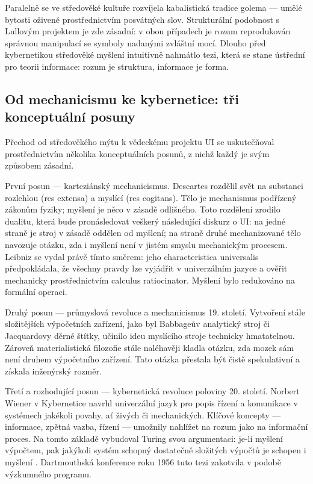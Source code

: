 Paralelně se ve středověké kultuře rozvíjela kabalistická tradice golema — umělé bytosti oživené prostřednictvím posvátných slov.
Strukturální podobnost s Lullovým projektem je zde zásadní: v obou případech je rozum reprodukován správnou manipulací se symboly nadanými zvláštní mocí.
Dlouho před kybernetikou středověké myšlení intuitivně nahmátlo tezi, která se stane ústřední pro teorii informace: rozum je struktura, informace je forma.

\subsection{Od mechanicismu ke kybernetice: tři konceptuální posuny}

Přechod od středověkého mýtu k vědeckému projektu UI se uskutečňoval prostřednictvím několika konceptuálních posunů, z nichž každý je svým způsobem zásadní.

První posun — karteziánský mechanicismus.
Descartes rozdělil svět na substanci rozlehlou (res extensa) a myslící (res cogitans).
Tělo je mechanismus podřízený zákonům fyziky; myšlení je něco v zásadě odlišného.
Toto rozdělení zrodilo dualitu, která bude pronásledovat veškerý následující diskurz o UI: na jedné straně je stroj v zásadě oddělen od myšlení; na straně druhé mechanizované tělo navozuje otázku, zda i myšlení není v jistém smyslu mechanickým procesem.
Leibniz se vydal právě tímto směrem: jeho characteristica universalis předpokládala, že všechny pravdy lze vyjádřit v univerzálním jazyce a ověřit mechanicky prostřednictvím calculus ratiocinator. Myšlení bylo redukováno na formální operaci.

Druhý posun — průmyslová revoluce a mechanicismus 19. století.
Vytvoření stále složitějších výpočetních zařízení, jako byl Babbageův analytický stroj či Jacquardovy děrné štítky, učinilo ideu myslícího stroje technicky hmatatelnou. Zároveň materialistická filozofie stále naléhavěji kladla otázku, zda mozek sám není druhem výpočetního zařízení. Tato otázka přestala být čistě spekulativní a získala inženýrský rozměr.

Třetí a rozhodující posun — kybernetická revoluce poloviny 20. století.
Norbert Wiener v Kybernetice \parencite{Wiener48} navrhl univerzální jazyk pro popis řízení a komunikace v systémech jakékoli povahy, ať živých či mechanických. Klíčové koncepty — informace, zpětná vazba, řízení — umožnily nahlížet na rozum jako na informační proces. Na tomto základě vybudoval Turing svou argumentaci: je-li myšlení výpočtem, pak jakýkoli systém schopný dostatečně složitých výpočtů je schopen i myšlení \parencite{Turing50}. Dartmouthská konference roku 1956 tuto tezi zakotvila v podobě výzkumného programu.


